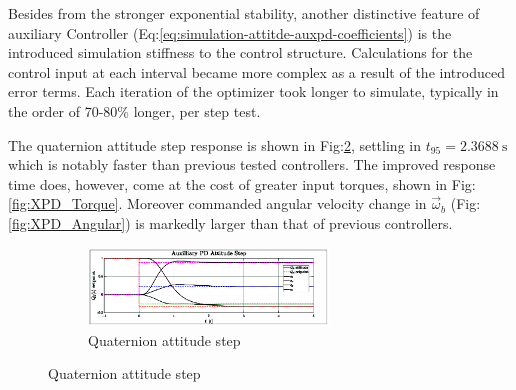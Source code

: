 Besides from the stronger exponential stability, another distinctive feature of auxiliary Controller (Eq:\ref{eq:simulation-attitde-auxpd-coefficients}) is the introduced simulation stiffness to the control structure. Calculations for the control input at each interval became more complex as a result of the introduced error terms. Each iteration of the optimizer took longer to simulate, typically in the order of 70-80\% longer, per step test.
\par
The quaternion attitude step response is shown in Fig:\ref{fig:XPD_Step}, settling in $t_{95}=2.3688~\text{s}$ which is notably faster than previous tested controllers. The improved response time does, however, come at the cost of greater input torques, shown in Fig:\ref{fig:XPD_Torque}. Moreover commanded angular velocity change in $\vec{\omega}_b$ (Fig:\ref{fig:XPD_Angular}) is markedly larger than that of previous controllers.
\begin{figure}[hbtp]
\vspace{-8pt}
\centering
\begin{subfigure}{\textwidth}
\centering
\includegraphics[width=0.7\textwidth]{graphs/XPD_Step}
\vspace{-6pt}
\caption{Quaternion attitude step}
\label{fig:XPD_Step}
\end{subfigure}
\vspace{-14pt}
\end{figure}
\newpage
